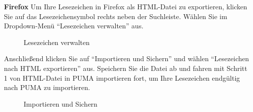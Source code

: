 \textbf{Firefox}
\newline Um Ihre Lesezeichen in Firefox als HTML-Datei zu exportieren, klicken Sie auf das Lesezeichensymbol rechts neben der Suchleiste. Wählen Sie im Dropdown-Menü \enquote{Lesezeichen verwalten} aus.

\begin{figure}[h!]
 \centering
 \caption{Lesezeichen verwalten}
 \label{fig:lesezeichenVerwalten}
\end{figure}
Anschließend klicken Sie auf \enquote{Importieren und Sichern} und wählen \enquote{Lesezeichen nach HTML exportieren} aus. Speichern Sie die Datei ab und fahren mit Schritt 1 von HTML-Datei in PUMA importieren fort, um Ihre Lesezeichen endgültig nach PUMA zu importieren.  

\begin{figure}[h!]
 \centering
 \caption{Importieren und Sichern}
 \label{fig:importierenSichern}
\end{figure}
